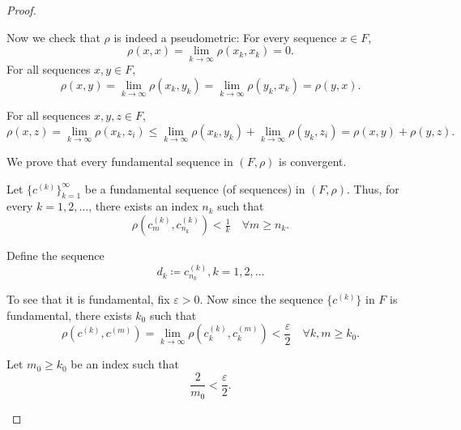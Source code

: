\begin{proof}
\begin{thmenum}
    Now we check that \( \rho \) is indeed a pseudometric:
     For every sequence \( x \in F \),
    \begin{equation*}
      \rho(x, x) = \lim_{k \to \infty} \rho(x_k, x_k) = 0.
    \end{equation*}
     For all sequences \( x, y \in F \),
    \begin{equation*}
      \rho(x, y) = \lim_{k \to \infty} \rho(x_k, y_k) = \lim_{k \to \infty} \rho(y_k, x_k) = \rho(y, x).
    \end{equation*}

     For all sequences \( x, y, z \in F \),
    \begin{equation*}
      \rho(x, z) = \lim_{k \to \infty} \rho(x_k, z_i) \leq \lim_{k \to \infty} \rho(x_k, y_k) + \lim_{k \to \infty} \rho(y_k, z_i) = \rho(x, y) + \rho(y, z).
    \end{equation*}

     We prove that every fundamental sequence in \( (F, \rho) \) is convergent.

    Let \( \{ c^{(k)} \}_{k=1}^\infty \) be a fundamental sequence (of sequences) in \( (F, \rho) \). Thus, for every \( k = 1, 2, \ldots \), there exists an index \( n_k \) such that
    \begin{equation*}
      \rho(c_m^{(k)}, c_{n_k}^{(k)}) < \tfrac 1 k \quad\forall m \geq n_k.
    \end{equation*}

    Define the sequence
    \begin{equation*}
      d_k \coloneqq c_{n_k}^{(k)}, k = 1, 2, \ldots
    \end{equation*}

    To see that it is fundamental, fix \( \varepsilon > 0 \). Now since the sequence \( \{ c^{(k)} \} \) in \( F \) is fundamental, there exists \( k_0 \) such that
    \begin{equation*}
      \rho(c^{(k)}, c^{(m)}) = \lim_{k \to \infty} \rho(c_k^{(k)}, c_k^{(m)}) < \frac \varepsilon 2 \quad\forall k, m \geq k_0.
    \end{equation*}

    Let \( m_0 \geq k_0 \) be an index such that
    \begin{equation*}
      \frac 2 {m_0} < \frac \varepsilon 2.
    \end{equation*}


\end{thmenum}
\end{proof}
